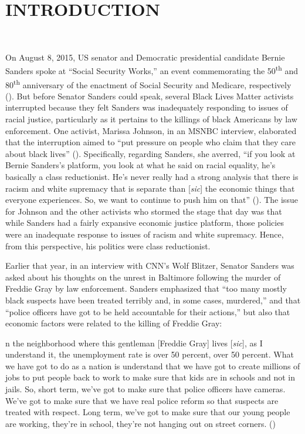 \documentclass[12pt]{article}
\renewenvironment{quote}
  {\list{}{\leftmargin=\parindent\rightmargin=0pt}%
   \item\relax}
  {\endlist}
\begin{document}

\section{INTRODUCTION} \

On August 8, 2015, US senator and Democratic presidential candidate Bernie Sanders spoke at “Social Security Works,” an event commemorating the 50\textsuperscript{th} and 80\textsuperscript{th} anniversary of the enactment of Social Security and Medicare, respectively (\cite{wilsonProtestersShutBernie2015}). But before Senator Sanders could speak, several Black Lives Matter activists interrupted because they felt Sanders was inadequately responding to issues of racial justice, particularly as it pertains to the killings of black Americans by law enforcement. One activist, Marissa Johnson, in an MSNBC interview, elaborated that the interruption aimed to “put pressure on people who claim that they care about black lives” (\cite{hallBernieSandersBlack2015}). Specifically, regarding Sanders, she averred, “if you look at Bernie Sanders’s platform, you look at what he said on racial equality, he’s basically a class reductionist. He’s never really had a strong analysis that there is racism and white supremacy that is separate than [\textit{sic}] the economic things that everyone experiences. So, we want to continue to push him on that” (\cite{hallBernieSandersBlack2015}). The issue for Johnson and the other activists who stormed the stage that day was that while Sanders had a fairly expansive economic justice platform, those policies were an inadequate response to issues of racism and white supremacy. Hence, from this perspective, his politics were class reductionist.

Earlier that year, in an interview with CNN’s Wolf Blitzer, Senator Sanders was asked about his thoughts on the unrest in Baltimore following the murder of Freddie Gray by law enforcement. Sanders emphasized that “too many mostly black suspects have been treated terribly and, in some cases, murdered,” and that “police officers have got to be held accountable for their actions,” but also that economic factors were related to the killing of Freddie Gray:

\begin{quote}
[I]n the neighborhood where this gentleman [Freddie Gray] lives [\textit{sic}], as I understand it, the unemployment rate is over 50 percent, over 50 percent. What we have got to do as a nation is understand that we have got to create millions of jobs to put people back to work to make sure that kids are in schools and not in jails. So, short term, we've got to make sure that police officers have cameras. We've got to make sure that we have real police reform so that suspects are treated with respect. Long term, we've got to make sure that our young people are working, they're in school, they're not hanging out on street corners. (\cite{sandersInterviewWolfBlitzer2015})
\end{quote}
\end{document}

